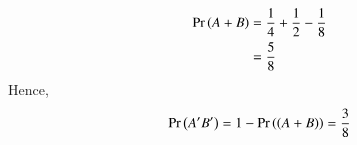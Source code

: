 \begin{align}
	\Pr\left(A+B\right) 
	&= \frac{1}{4} +\frac{1}{2} - \frac{1}{8} \\
	&= \frac{5}{8}
\end{align}
Hence, 
\begin{align}
	\Pr\left(A^{\prime}B^{\prime}\right) 
	= 1-\Pr\left(\left(A+B\right)\right)
	= \frac{3}{8}
\end{align}
